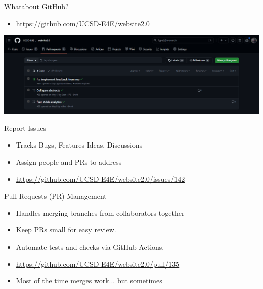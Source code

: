 \documentclass[aspectratio=169]{beamer}
\begin{document}
\begin{frame}{Whatabout GitHub?}
    \begin{itemize}
        \item \href{https://github.com/UCSD-E4E/website2.0}{https://github.com/UCSD-E4E/website2.0}
    \end{itemize}
    \begin{center}
        \includegraphics[scale=.35]{github.png}
    \end{center}
\end{frame}

\begin{frame}{Report Issues}
    \begin{itemize}
        \item Tracks Bugs, Features Ideas, Discussions
        \item Assign people and PRs to address
        \item \href{https://github.com/UCSD-E4E/website2.0/issues/142}{https://github.com/UCSD-E4E/website2.0/issues/142}
    \end{itemize}
\end{frame}

\begin{frame}{Pull Requests (PR) Management}
    \begin{itemize}
        \item Handles merging branches from collaborators together
        \item Keep PRs small for easy review.
        \item Automate tests and checks via GitHub Actions.
        \item \href{https://github.com/UCSD-E4E/website2.0/pull/135}{https://github.com/UCSD-E4E/website2.0/pull/135}
        \item Most of the time merges work... but sometimes
    \end{itemize}
\end{frame}
\end{document}

